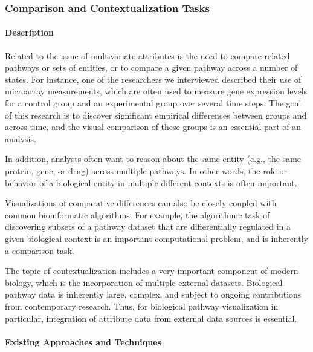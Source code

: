 \documentclass[twocolumn]{bmcart}%
\begin{document}
\subsubsection*{Comparison and Contextualization Tasks}

\paragraph*{Description}

Related to the issue of multivariate attributes is the need to compare related pathways or sets of entities, or to compare a given pathway across a number of states.
For instance, one of the researchers we interviewed described their use of microarray measurements, which are often used to measure gene expression levels for a control group and an experimental group over several time steps.
The goal of this research is to discover significant empirical differences between groups and across time, and the visual comparison of these groups is an essential part of an analysis.

In addition, analysts often want to reason about the same entity (e.g., the same protein, gene, or drug) across multiple pathways.
In other words, the role or behavior of a biological entity in multiple different contexts is often important.

Visualizations of comparative differences can also be closely coupled with common bioinformatic algorithms.
For example, the algorithmic task of discovering subsets of a pathway dataset that are differentially regulated in a given biological context is an important computational problem, and is inherently a comparison task.

The topic of contextualization includes a very important component of modern biology, which is the incorporation of multiple external datasets.
Biological pathway data is inherently large, complex, and subject to ongoing contributions from contemporary research.
Thus, for biological pathway visualization in particular, integration of attribute data from external data sources is essential.





\paragraph*{Existing Approaches and Techniques}
\end{document}
